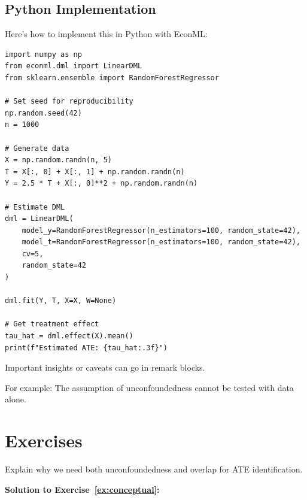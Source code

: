 \subsection{Python Implementation}

Here's how to implement this in Python with EconML:

\begin{verbatim}
import numpy as np
from econml.dml import LinearDML
from sklearn.ensemble import RandomForestRegressor

# Set seed for reproducibility
np.random.seed(42)
n = 1000

# Generate data
X = np.random.randn(n, 5)
T = X[:, 0] + X[:, 1] + np.random.randn(n)
Y = 2.5 * T + X[:, 0]**2 + np.random.randn(n)

# Estimate DML
dml = LinearDML(
    model_y=RandomForestRegressor(n_estimators=100, random_state=42),
    model_t=RandomForestRegressor(n_estimators=100, random_state=42),
    cv=5,
    random_state=42
)

dml.fit(Y, T, X=X, W=None)

# Get treatment effect
tau_hat = dml.effect(X).mean()
print(f"Estimated ATE: {tau_hat:.3f}")
\end{verbatim}


\begin{remark}
Important insights or caveats can go in remark blocks.

For example: The assumption of unconfoundedness cannot be tested with data alone.
\end{remark}


\section{Exercises}

\begin{exercise}
\label{ex:conceptual}
Explain why we need both unconfoundedness and overlap for ATE identification.
\end{exercise}

\textbf{Solution to Exercise~\ref{ex:conceptual}:}

